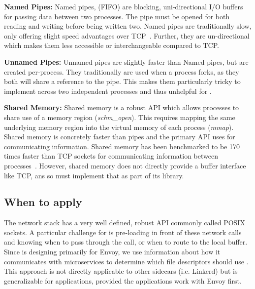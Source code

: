 \textbf{Named Pipes:}
Named pipes, (FIFO) are blocking, uni-directional I/O buffers for passing data between two processes.
The pipe must be opened for both reading and writing before being written two.
Named pipes are traditionally slow, only offering slight speed advantages over TCP~\cite{ipcperf}.
Further, they are un-directional which makes them less accessible or interchangeable compared to TCP.

\textbf{Unnamed Pipes:}
Unnamed pipes are slightly faster than Named pipes, but are created per-process.
They traditionally are used when a process forks, as they both will share a reference to the pipe.
This makes them particularly tricky to implement across two independent processes and thus unhelpful for \sysname.

\textbf{Shared Memory:}
Shared memory is a robust API which allows processes to share use of a memory region (\textit{schm\_open}).
This requires mapping the same underlying memory region into the virtual memory of each process (\textit{mmap}).
Shared memory is concretely faster than pipes and the primary API \sysname uses for communicating information.
Shared memory has been benchmarked to be 170 times faster than TCP sockets for communicating information between processes~\cite{ipcperf}.
However, shared memory does not directly provide a buffer interface like TCP, ans so \sysname must implement that as part of its library.


\subsection{When to apply \sysname}
The network stack has a very well defined, robust API commonly called POSIX sockets.
A particular challenge for \sysname is pre-loading in front of these network calls and knowing when
to pass through the call, or when to route to the local buffer.
Since \sysname is designing primarily for Envoy, we use information about how it communicates with microservices to determine
which file descriptors should use \sysname.
This approach is not directly applicable to other sidecars (i.e. Linkerd) but is generalizable for applications, provided the applications work with Envoy first.

